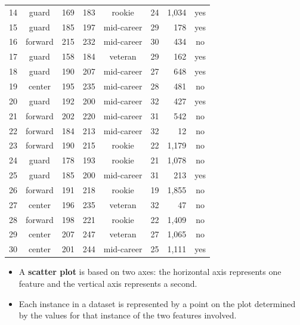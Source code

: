 \documentclass[xcolor={table}]{beamer}
\newcommand{\indexkeyword}[1]{\alert{\textbf{#1}\index{#1}}}
\begin{document}
\begin{frame} [plain]
\begin{table}
\begin{tiny}
{\begin{tabular}{  c c c c c c r c}
14	&	guard	&	169	&	183	&	rookie	&	24		&	1,034	&	yes\\
15	&	guard	&	185	&	197	&	mid-career	&	29		&	178	&	yes\\
16	&	forward	&	215	&	232	&	mid-career	&	30		&	434	&	no\\
17	&	guard	&	158	&	184	&	veteran	&	29		&	162	&	yes\\
18	&	guard	&	190	&	207	&	mid-career	&	27		&	648	&	yes\\
19	&	center	&	195	&	235	&	mid-career	&	28		&	481	&	no\\
20	&	guard	&	192	&	200	&	mid-career	&	32		&	427	&	yes\\
21	&	forward	&	202	&	220	&	mid-career	&	31		&	542	&	no\\
22	&	forward	&	184	&	213	&	mid-career	&	32		&	12	&	no\\
23	&	forward	&	190	&	215	&	rookie	&	22		&	1,179	&	no\\
24	&	guard	&	178	&	193	&	rookie	&	21		&	1,078	&	no\\
25	&	guard	&	185	&	200	&	mid-career	&	31	&	213	&	yes\\
26	&	forward	&	191	&	218	&	rookie	&	19		&	1,855	&	no\\
27	&	center	&	196	&	235	&	veteran	&	32		&	47	&	no\\
28	&	forward	&	198	&	221	&	rookie	&	22		&	1,409	&	no\\
29	&	center	&	207	&	247	&	veteran	&	27		&	1,065	&	no\\
30	&	center	&	201	&	244	&	mid-career	&	25	&	1,111	&	yes	\\
\hline
\end{tabular}}
\end{tiny}
\end{table}
\end{frame} 

\begin{frame}
	\begin{itemize}
		\item A \indexkeyword{scatter plot} is based on two axes: the horizontal axis represents one feature and the vertical axis represents a second. 
		\item Each instance in a dataset is represented by a point on the plot determined by the values for that instance of the two features involved. 
	\end{itemize}
\end{frame}
\end{document}
